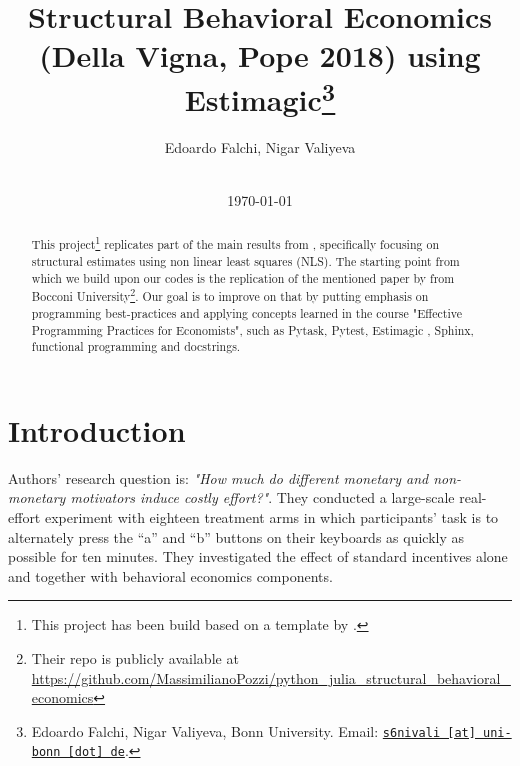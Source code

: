 \documentclass[11pt, a4paper, leqno]{article}
\begin{document}
\title{Structural Behavioral Economics (Della Vigna, Pope 2018) using Estimagic\thanks{Edoardo Falchi, Nigar Valiyeva, Bonn University. Email: \href{mailto:s6nivali@uni-bonn.de}{\nolinkurl{s6nivali [at] uni-bonn [dot] de}}.}}

\author{Edoardo Falchi, Nigar Valiyeva}

\date{
    \\[1ex]
    \today
}

\maketitle


\begin{abstract}
    This project\footnote{This project has been build based on a template by \cite{GaudeckerEconProjectTemplates}.} replicates part of the main results from \cite{dellavigna2018motivates}, specifically focusing on structural estimates using non linear least squares (NLS). The starting point from which we build upon our codes is the replication of the mentioned paper by \cite{PozziNunnari} from Bocconi University\footnote{Their repo is publicly available at \url{https://github.com/MassimilianoPozzi/python_julia_structural_behavioral_economics}}. Our goal is to improve on that by putting emphasis on programming best-practices and applying concepts learned in the course "Effective Programming Practices for Economists", such as Pytask, Pytest, Estimagic \citep{Gabler2021}, Sphinx, functional programming and docstrings. 
\end{abstract}
\clearpage

\section{Introduction} %
\label{sec:introduction}
Authors' research question is: \emph{"How much do different monetary and non-monetary motivators induce costly effort?"}. They conducted a large-scale real-effort experiment with eighteen treatment arms in which participants' task is to alternately press the “a” and “b” buttons on their keyboards as quickly as possible for ten minutes. They investigated the effect of standard incentives alone and together with behavioral economics components.
\end{document}
